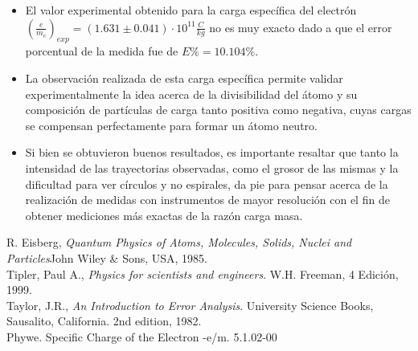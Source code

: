\documentclass[prb,aps,twocolumn,preprintnumbers,amsmath,amssymb]{revtex4}
\begin{document}
\begin{itemize}
	
	\item El valor experimental obtenido para la carga específica del electrón $\left( \frac{e}{m_{e}} \right)_{exp} = (1.631 \pm 0.041) \cdot 10^{11} \frac{C}{kg}$ no es muy exacto dado a que el error porcentual de la medida fue de $E\% = 10.104\%$.
		
	\item La observación realizada de esta carga específica permite validar experimentalmente la idea acerca de la divisibilidad del átomo y su composición de partículas de carga tanto positiva como negativa, cuyas cargas se compensan perfectamente para formar un átomo neutro.
	
	\item Si bien se obtuvieron buenos resultados, es importante resaltar que tanto la intensidad de las trayectorias observadas, como el grosor de las mismas y la dificultad para ver círculos y no espirales, da pie para pensar acerca de la realización de medidas con instrumentos de mayor resolución con el fin de obtener mediciones más exactas de la razón carga masa.
	
\end{itemize}

\begin{thebibliography}{99}
 R. Eisberg, {\it Quantum Physics of Atoms, Molecules, Solids, Nuclei and Particles}{John Wiley \& Sons, USA, 1985}.\\

 Tipler, Paul A., \textit{Physics for scientists and engineers}. W.H. Freeman, 4 Edici\' on, 1999.\\
 Taylor, J.R., \textit{An Introduction to Error Analysis}. University Science Books, Sausalito, California. 2nd edition, 1982.\\
 Phywe. Specific Charge of the Electron -e/m. 5.1.02-00\\
\end{thebibliography}
\end{document}
